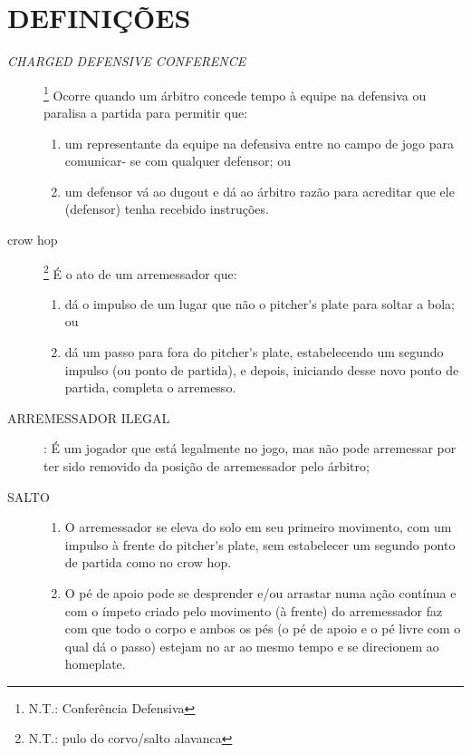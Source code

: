 	\section{DEFINI\c{C}\~OES} 
	\begin{description}
		\item[\textit{CHARGED DEFENSIVE CONFERENCE}]\footnote{N.T.: Confer\^encia Defensiva } Ocorre quando um \'arbitro concede tempo \`a equipe na defensiva ou paralisa a partida para permitir que: 
		
		\begin{enumerate}[label=\alph*)]
			\item um representante da equipe na defensiva entre no campo de jogo para comunicar-
			se com qualquer defensor; ou 
			
			\item  um defensor vá ao \Gls{dugout} e d\'a ao \'arbitro raz\~ao para acreditar que ele (defensor) tenha recebido instru\c{c}\~oes. 
		\end{enumerate}
	\item[\Gls{crow hop}]\footnote{N.T.: pulo do corvo/salto alavanca} \'E o ato de um arremessador que: 

	\begin{enumerate}[label=\alph*)]
		\item d\'a o impulso de um lugar que n\~ao o \gls{pitcher's plate} para soltar a bola; ou 
		
		\item  d\'a um passo para fora do \gls{pitcher's plate}, estabelecendo um segundo impulso (ou 		ponto de partida), e depois, iniciando desse novo ponto de partida, completa o 
		arremesso. 
	\end{enumerate}

	\item[ARREMESSADOR ILEGAL]: \'E um jogador que est\'a legalmente no jogo, mas n\~ao pode arremessar por ter sido removido da posi\c{c}\~ao de arremessador pelo \'arbitro;
	
		\item[SALTO]
			
	\begin{enumerate}[label=\alph*)]
		\item O arremessador se eleva do solo em seu primeiro movimento, com um impulso \`a 
		frente do \gls{pitcher's plate}, sem estabelecer um segundo ponto de partida como no 
		\gls{crow hop}. 
		
		\item  O p\'e de apoio pode se desprender e/ou arrastar numa a\c{c}\~ao cont\'inua e com o 
		\'impeto criado pelo movimento (\`a frente) do arremessador faz com que todo o corpo e 
		ambos os p\'es (o p\'e de apoio e o p\'e livre com o qual d\'a o passo) estejam no ar ao 
		mesmo tempo e se direcionem ao \gls{homeplate}. 
		

\end{enumerate}
\end{description}
